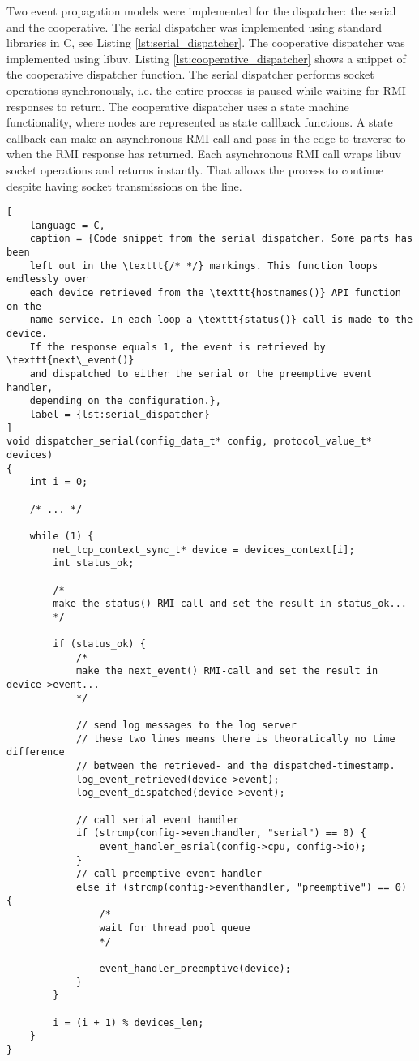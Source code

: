 Two event propagation models were implemented for the dispatcher: the serial
and the cooperative. The serial dispatcher was implemented using standard
libraries in C, see Listing \ref{lst:serial_dispatcher}. The cooperative
dispatcher was implemented using libuv. Listing
\ref{lst:cooperative_dispatcher} shows a snippet of the cooperative dispatcher
function. The serial dispatcher performs socket operations synchronously, i.e.
the entire process is paused while waiting for RMI responses to return. The
cooperative dispatcher uses a state machine functionality, where nodes are
represented as state callback functions. A state callback can make an
asynchronous RMI call and pass in the edge to traverse to when the RMI response
has returned. Each asynchronous RMI call wraps libuv socket operations and
returns instantly. That allows the process to continue despite having socket
transmissions on the line.

\begin{lstlisting}[
    language = C,
    caption = {Code snippet from the serial dispatcher. Some parts has been
    left out in the \texttt{/* */} markings. This function loops endlessly over
    each device retrieved from the \texttt{hostnames()} API function on the
    name service. In each loop a \texttt{status()} call is made to the device.
    If the response equals 1, the event is retrieved by \texttt{next\_event()}
    and dispatched to either the serial or the preemptive event handler,
    depending on the configuration.},
    label = {lst:serial_dispatcher}
]
void dispatcher_serial(config_data_t* config, protocol_value_t* devices)
{
    int i = 0;

    /* ... */

    while (1) {
        net_tcp_context_sync_t* device = devices_context[i];
        int status_ok;

        /*
        make the status() RMI-call and set the result in status_ok...
        */

        if (status_ok) {
            /*
            make the next_event() RMI-call and set the result in device->event...
            */

            // send log messages to the log server
            // these two lines means there is theoratically no time difference
            // between the retrieved- and the dispatched-timestamp.
            log_event_retrieved(device->event);
            log_event_dispatched(device->event);

            // call serial event handler
            if (strcmp(config->eventhandler, "serial") == 0) {
                event_handler_esrial(config->cpu, config->io);
            }
            // call preemptive event handler
            else if (strcmp(config->eventhandler, "preemptive") == 0) {
                /*
                wait for thread pool queue
                */

                event_handler_preemptive(device);
            }
        }

        i = (i + 1) % devices_len;
    }
}
\end{lstlisting}

